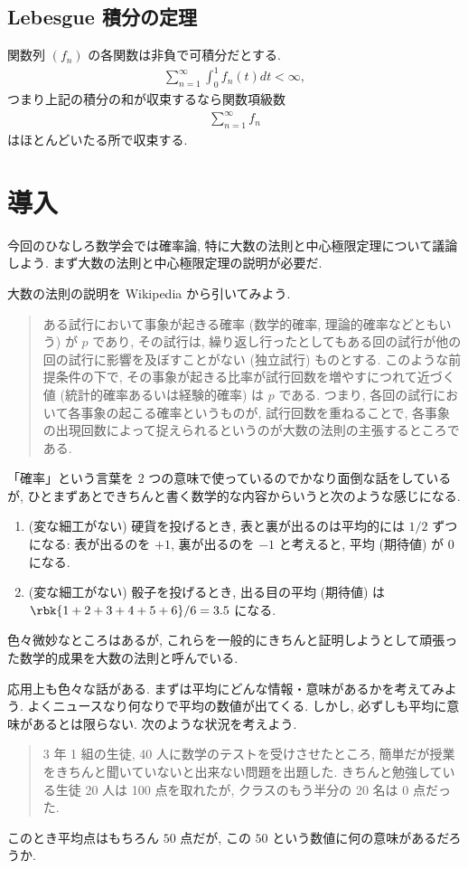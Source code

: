\documentclass[openany, a4paper, oneside]{jsbook}
\begin{document}
\subsection{Lebesgue 積分の定理}

\begin{thm}\label{Hinashiro_math_party_1_probability_18}
 関数列 $(f_n)$ の各関数は非負で可積分だとする.
\begin{align}
 \sum_{n=1}^{\infty} \int_0^1 f_n (t) dt < \infty,
\end{align}
つまり上記の積分の和が収束するなら関数項級数
\begin{align}
 \sum_{n=1}^{\infty} f_n
\end{align}
はほとんどいたる所で収束する.
\end{thm}
\section{導入}

今回のひなしろ数学会では確率論, 特に大数の法則と中心極限定理について議論しよう.
まず大数の法則と中心極限定理の説明が必要だ.

大数の法則の説明を Wikipedia から引いてみよう.
\begin{quote}
ある試行において事象が起きる確率 (数学的確率, 理論的確率などともいう) が $p$ であり,
その試行は, 繰り返し行ったとしてもある回の試行が他の回の試行に影響を及ぼすことがない (独立試行) ものとする.
このような前提条件の下で, その事象が起きる比率が試行回数を増やすにつれて近づく値 (統計的確率あるいは経験的確率) は $p$ である.
つまり, 各回の試行において各事象の起こる確率というものが,
試行回数を重ねることで, 各事象の出現回数によって捉えられるというのが大数の法則の主張するところである.
\end{quote}
「確率」という言葉を 2 つの意味で使っているのでかなり面倒な話をしているが,
ひとまずあとできちんと書く数学的な内容からいうと次のような感じになる.
\begin{enumerate}
\item (変な細工がない) 硬貨を投げるとき, 表と裏が出るのは平均的には $1/2$ ずつになる:
表が出るのを $+1$, 裏が出るのを $-1$ と考えると, 平均 (期待値) が $0$ になる.
\item (変な細工がない) 骰子を投げるとき, 出る目の平均 (期待値) は $\rbk{1+2+3+4+5+6}/6 = 3.5$ になる.
\end{enumerate}
色々微妙なところはあるが, これらを一般的にきちんと証明しようとして頑張った数学的成果を大数の法則と呼んでいる.

応用上も色々な話がある.
まずは平均にどんな情報・意味があるかを考えてみよう.
よくニュースなり何なりで平均の数値が出てくる.
しかし, 必ずしも平均に意味があるとは限らない.
次のような状況を考えよう.
\begin{quote}
3 年 1 組の生徒, 40 人に数学のテストを受けさせたところ,
簡単だが授業をきちんと聞いていないと出来ない問題を出題した.
きちんと勉強している生徒 20 人は 100 点を取れたが, クラスのもう半分の 20 名は 0 点だった.
\end{quote}
このとき平均点はもちろん $50$ 点だが, この $50$ という数値に何の意味があるだろうか.
\end{document}

